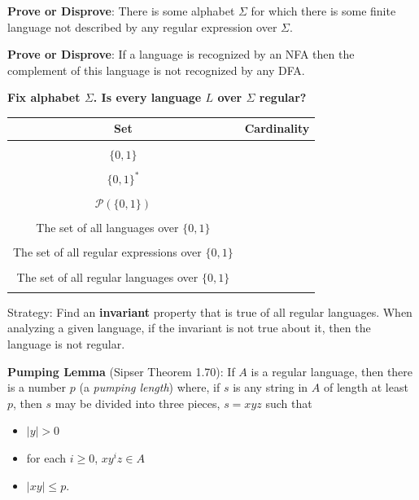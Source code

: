 \documentclass[12pt, oneside]{article}
\begin{document}
\vfill

{\bf Prove or Disprove}: There is some alphabet $\Sigma$ for which there is 
some finite language not described by any regular expression over $\Sigma$.

\vfill

{\bf Prove or Disprove}: If a language is recognized by an NFA 
then the complement of this language is not recognized by any DFA.

\vfill

\newpage

{\bf Fix alphabet $\Sigma$. Is every language $L$ over $\Sigma$ regular?}

\begin{center}
\begin{tabular}{c|c}
Set & Cardinality \\
\hline
& \\
$\{0,1\}$ & \\
& \\
$\{0,1\}^*$ & \\
& \\
$\mathcal{P}( \{0,1\})$ & \\
& \\
The set of all languages over $\{0,1\}$ & \\
& \\
The set of all regular expressions over $\{0,1\}$ & \\
& \\
The set of all regular languages over $\{0,1\}$ & \\
& \\
\end{tabular}
\end{center}



\vfill
Strategy: Find an {\bf invariant} property that is true of all regular languages. When analyzing 
a given language, if the invariant is not true about it, then the language is not regular.
\newpage

{\bf Pumping Lemma} (Sipser Theorem 1.70): If $A$ is a regular language, then there
is a number $p$ (a {\it pumping length}) where, if $s$ is any string in $A$ of length at least $p$, 
then $s$ may be divided into three pieces, $s = xyz$ such that
\vspace{-10pt}
\begin{itemize}
\item $|y| > 0$
\item for each $i \geq 0$, $xy^i z \in A$
\item $|xy| \leq p$.
\end{itemize}
\end{document}
